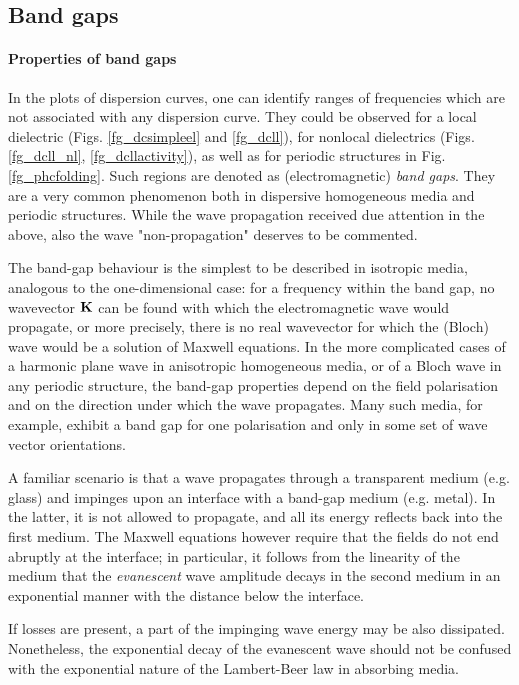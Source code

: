 \subsection{Band gaps} 
\paragraph{Properties of band gaps} %
In the plots of dispersion curves, one can identify ranges of frequencies which are not associated with any dispersion curve. 
They could be observed for a local dielectric (Figs. \ref{fg_dcsimpleel} and \ref{fg_dcll}), for nonlocal dielectrics (Figs. \ref{fg_dcll_nl}, \ref{fg_dcllactivity}), as well as for periodic structures in Fig. \ref{fg_phcfolding}. Such regions are denoted as (electromagnetic) \textit{band gaps}. They are a very common phenomenon both in dispersive homogeneous media and periodic structures. 
While the wave propagation received due attention in the above, also the wave "non-propagation" deserves to be commented.

The band-gap behaviour is the simplest to be described in isotropic media, analogous to the one-dimensional case: for a frequency within the band gap, no wavevector ${\mathbf{K}}$ can be found with which the electromagnetic wave would propagate, or more precisely, there is no real wavevector for which the (Bloch) wave would be a solution of Maxwell equations. In the more complicated cases of a harmonic plane wave in anisotropic homogeneous media, or of a Bloch wave in any periodic structure, the band-gap properties depend on the field polarisation and on the direction under which the wave propagates. Many such media, for example, exhibit a band gap for one polarisation and only in some set of wave vector orientations.

A familiar scenario is that a wave propagates through a transparent medium (e.g. glass) and impinges upon an interface with a band-gap medium (e.g. metal). In the latter, it is not allowed to propagate, and all its energy reflects back into the first medium. The Maxwell equations however require that the fields do not end abruptly at the interface; in particular, it follows from the linearity of the medium that the \textit{evanescent} wave amplitude decays in the second medium in an exponential manner with the distance below the interface.

If losses are present, a part of the impinging wave energy may be also dissipated. Nonetheless, the exponential decay of the evanescent wave should not be confused with the exponential nature of the Lambert-Beer law in absorbing media.

